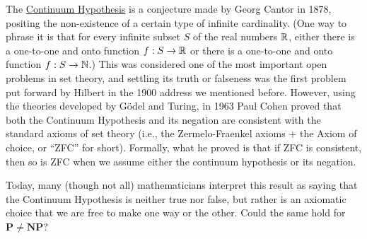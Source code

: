 The \href{https://en.wikipedia.org/wiki/Continuum_hypothesis}{Continuum
Hypothesis} is a conjecture made by Georg Cantor in 1878, positing the
non-existence of a certain type of infinite cardinality. (One way to
phrase it is that for every infinite subset \(S\) of the real numbers
\({\mathbb{R}}\), either there is a one-to-one and onto function
\(f:S \rightarrow {\mathbb{R}}\) or there is a one-to-one and onto function
\(f:S \rightarrow {\mathbb{N}}\).) This was considered one of the most important
open problems in set theory, and settling its truth or falseness was the
first problem put forward by Hilbert in the 1900 address we mentioned
before. However, using the theories developed by Gödel and Turing, in
1963 Paul Cohen proved that both the Continuum Hypothesis and its
negation are consistent with the standard axioms of set theory (i.e.,
the Zermelo-Fraenkel axioms + the Axiom of choice, or ``ZFC'' for
short). Formally, what he proved is that if ZFC is consistent, then so
is ZFC when we assume either the continuum hypothesis or its negation.

Today, many (though not all) mathematicians interpret this result as
saying that the Continuum Hypothesis is neither true nor false, but
rather is an axiomatic choice that we are free to make one way or the
other. Could the same hold for \(\mathbf{P} \neq \mathbf{NP}\)?

